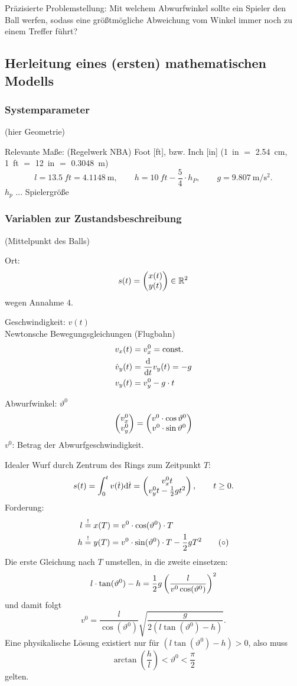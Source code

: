 Präzisierte Problemstellung: Mit welchem Abwurfwinkel sollte ein Spieler den
Ball werfen, sodass eine größtmögliche Abweichung vom Winkel immer noch zu einem
Treffer führt?

\subsection{Herleitung eines (ersten) mathematischen Modells}
\subsubsection*{Systemparameter}
(hier Geometrie)

Relevante Maße: (Regelwerk NBA) Foot [\si{ft}], bzw. Inch [\si{in}]
(\SI{1}{in} $=$ \SI{2.54}{\cm}, \SI{1}{ft} $=$ \SI{12}{in} $=$ \SI{0.3048}{\m})
\[ l = \SI{13.5}{ft} = \SI{4.1148}{\m}, \qquad h = \SI{10}{ft} - \frac{5}{4}
  \cdot h_P, \qquad g = \SI{9.807}{\m \per \second \squared}. \]
$h_p$ ... Spielergröße

\subsubsection*{Variablen zur Zustandsbeschreibung}
(Mittelpunkt des Balls)

Ort:
\[ s(t) = \begin{pmatrix}x(t) \\ y(t)\end{pmatrix} \in \mathbb{R}^2  \]
wegen Annahme 4.

Geschwindigkeit: $v(t)$ \\
Newtonsche Bewegungsgleichungen (Flugbahn)
\begin{align*}
  v_x(t) &= v_x^0 = \mathrm{const}. \\
  \dot{v}_y(t) &= \frac{\mathrm{d} }{\mathrm{d} t} v_y(t) = -g \\
  v_y(t) &= v_y^0 - g \cdot t
\end{align*}

Abwurfwinkel: $\vartheta^0$
\[ \begin{pmatrix} v_x^0 \\ v_y^0 \end{pmatrix} = \begin{pmatrix} v^0 \cdot \cos \vartheta^0 \\ v^0 \cdot \sin
    \vartheta^0 \end{pmatrix} \]
$v^0$: Betrag der Abwurfgeschwindigkeit.

Idealer Wurf durch Zentrum des Rings zum Zeitpunkt $T$:
\[ s(t) = \int_0^t v(\obar{t}) \diffop \obar{t} = \pmat{ v_x^0 t \\ v_y^0 t -
    \rez{2} g t^2 }, \qquad t \ge 0. \]
Forderung:
\begin{align*}
  l &\overset{!}{=} x(T) = v^0 \cdot \cos (\vartheta^0) \cdot T \\
  h &\overset{!}{=} y(T) = v^0 \cdot \sin (\vartheta^0) \cdot T - \frac{1}{2} g T^2
      \tag{$\circ$}
\end{align*}
Die erste Gleichung nach $T$ umstellen, in die zweite einsetzen:
\[  l \cdot \tan(\vartheta^0) - h = \frac{1}{2} g \left( \frac{l}{ v^0
      \cos(\vartheta^0)} \right)^2 \]
und damit folgt
\[  v^0 = \frac{l}{\cos(\vartheta^0)} \sqrt{\frac{g}{2(l \tan(\vartheta^0) -
      h)}}. \]
Eine physikalische Lösung existiert nur für $(l \tan(\vartheta^0) - h) > 0$,
also muss
\[ \arctan \left( \frac{h}{l} \right) < \vartheta^0 < \frac{\pi}{2} \]
gelten.

